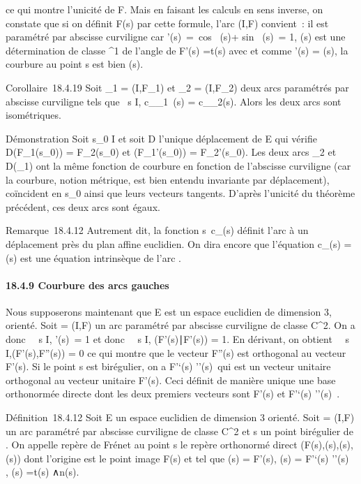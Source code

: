 \documentclass[]{article}
\begin{document}
ce qui montre l'unicité de F. Mais en faisant les calculs en sens
inverse, on constate que si on définit F(s) par cette formule, l'arc
(I,F) convient~: il est paramétré par abscisse curviligne car
\F'(s)\
=\ cos~
\phi(s)\vec\imath + sin~
\phi(s)\ = 1, \phi(s) est une
détermination de classe ^1 de l'angle de F'(s)
=\vec t(s) avec \vec\imath et comme
\phi'(s) = \gamma(s), la courbure au point s est bien \gamma(s).

Corollaire~18.4.19 Soit \Gamma_1 = (I,F_1) et \Gamma_2
= (I,F_2) deux arcs paramétrés par abscisse curviligne tels que
\forall~s \in I, c_\Gamma_1~(s) =
c_\Gamma_2(s). Alors les deux arcs sont isométriques.

Démonstration Soit s_0 \in I et soit D l'unique déplacement de E
qui vérifie D(F_1(s_0)) = F_2(s_0)
et \overrightarrowD(F_1'(s_0)) =
F_2'(s_0). Les deux arcs \Gamma_2 et
D(\Gamma_1) ont la même fonction de courbure en fonction de
l'abscisse curviligne (car la courbure, notion métrique, est bien
entendu invariante par déplacement), coïncident en s_0 ainsi
que leurs vecteurs tangents. D'après l'unicité du théorème précédent,
ces deux arcs sont égaux.

Remarque~18.4.12 Autrement dit, la fonction
s\mapsto~c_\Gamma(s) définit l'arc \Gamma à un
déplacement près du plan affine euclidien. On dira encore que l'équation
c_\Gamma(s) = \gamma(s) est une équation intrinsèque de l'arc \Gamma.

\paragraph{18.4.9 Courbure des arcs gauches}

Nous supposerons maintenant que E est un espace euclidien de dimension
3, orienté. Soit \Gamma = (I,F) un arc paramétré par abscisse curviligne de
classe C^2. On a donc \forall~~s \in I,
\F'(s)\ = 1 et donc
\forall~~s \in I,
(F'(s)∣F'(s)) = 1. En dérivant, on obtient
\forall~~s \in I,(F'(s),F''(s)) = 0 ce qui montre que le
vecteur F''(s) est orthogonal au vecteur F'(s). Si le point s est
birégulier, on a  F'`(s) \over
\F''(s)\ qui est un
vecteur unitaire orthogonal au vecteur unitaire F'(s). Ceci définit de
manière unique une base orthonormée directe dont les deux premiers
vecteurs sont F'(s) et  F'`(s) \over
\F''(s)\ .

Définition~18.4.12 Soit E un espace euclidien de dimension 3 orienté.
Soit \Gamma = (I,F) un arc paramétré par abscisse curviligne de classe
C^2 et s un point birégulier de \Gamma. On appelle repère de
Frénet au point s le repère orthonormé direct
(F(s),\vect(s),\vecn(s),\vecb(s))
dont l'origine est le point image F(s) et tel que
\vect(s) = F'(s), \vecn(s) =
F'`(s) \over
\F''(s)\\
, \vecb(s) =\vec t(s)
∧\vec n(s).
\end{document}
